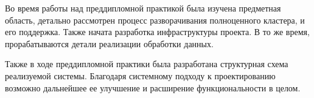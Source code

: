 \pagebreak
{}
\label{sec:outro}


Во время работы над преддипломной практикой была изучена предметная область, детально рассмотрен процесс разворачивания полноценного кластера, и его поддержка.
Также начата разработка инфраструктуры проекта.
В то же время, прорабатываются детали реализации обработки данных.

Также в ходе преддипломной практики была разработана структурная схема реализуемой системы. 
Благодаря системному подходу к проектированию возможно дальнейшее ее улучшение и расширение функциональности в целом.